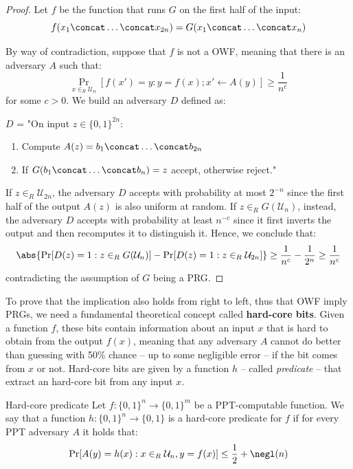 \documentclass[a4paper, 12pt]{report}
\begin{document}
    \begin{proof}
        Let $f$ be the function that runs $G$ on the first half of the input:
        \[f(x_1 \concat \ldots \concat x_{2n}) = G(x_1 \concat \ldots \concat x_n)\]
        
        By way of contradiction, suppose that $f$ is not a OWF, meaning that there is an adversary $A$ such that:
        \[\Pr_{x \in_R \mathcal{U}_n}[f(x') = y : y = f(x); x' \gets A(y)] \geq \frac{1}{n^c}\]
        for some $c > 0$. We build an adversary $D$ defined as:

        $D$ = "On input $z \in \{0,1\}^{2n}$:
        \begin{enumerate}
            \item Compute $A(z) = b_1 \concat \ldots \concat b_{2n}$
            \item If $G(b_1 \concat \ldots \concat b_n) = z$ accept, otherwise reject."
        \end{enumerate}

        If $z \in_R \mathcal{U}_{2n}$, the adversary $D$ accepts with probability at most $2^{-n}$ since the first half of the output $A(z)$ is also uniform at random. If $z \in_R G(\mathcal{U}_{n})$, instead, the adversary $D$ accepts with probability at least $n^{-c}$ since it first inverts the output and then recomputes it to distinguish it. Hence, we conclude that:
        \[\abs{\Pr[D(z) = 1 : z \in_R G(\mathcal{U}_n)] - \Pr[D(z) = 1 : z \in_R \mathcal{U}_{2n}]} \geq \frac{1}{n^c} - \frac{1}{2^n} \geq \frac{1}{n^c}\]
        contradicting the assumption of $G$ being a PRG.
    \end{proof}

    To prove that the implication also holds from right to left, thus that OWF imply PRGs, we need a fundamental theoretical concept called \textbf{hard-core bits}. Given a function $f$, these bits contain information about an input $x$ that is hard to obtain from the output $f(x)$, meaning that any adversary $A$ cannot do better than guessing with 50\% chance -- up to some negligible error -- if the bit comes from $x$ or not. Hard-core bits are given by a function $h$ -- called \textit{predicate} -- that extract an hard-core bit from any input $x$.

    \begin{frameddefn}{Hard-core predicate}
        Let $f : \{0,1\}^n \to \{0,1\}^m$ be a PPT-computable function. We say that a function $h : \{0,1\}^n \to \{0,1\}$ is a hard-core predicate for $f$ if for every PPT adversary $A$ it holds that:
        \[\Pr[A(y) = h(x) : x \in_R \mathcal{U}_n, y = f(x)] \leq \frac{1}{2} + \negl(n)\]
    \end{frameddefn}
    
\end{document}
